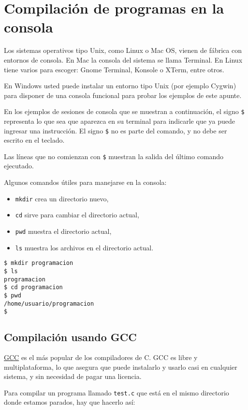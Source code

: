 \section{Compilación de programas en la consola}

Los sistemas operativos tipo Unix, como Linux o Mac OS, vienen de
fábrica con entornos de consola. En Mac la consola del sistema se llama
Terminal. En Linux tiene varios para escoger: Gnome Terminal, Konsole o
XTerm, entre otros.

En Windows usted puede instalar un entorno tipo Unix (por ejemplo
Cygwin) para disponer de una consola funcional para probar los ejemplos
de este apunte.

En los ejemplos de sesiones de consola que se muestran a continuación,
el signo \lstinline!$! representa lo que sea que aparezca en su terminal
para indicarle que ya puede ingresar una instrucción. El signo
\lstinline!$! no es parte del comando, y no debe ser escrito en el
teclado.

Las líneas que no comienzan con \lstinline!$! muestran la salida del
último comando ejecutado.

Algunos comandos útiles para manejarse en la consola:

\begin{itemize}
\item
  \lstinline!mkdir! crea un directorio nuevo,
\item
  \lstinline!cd! sirve para cambiar el directorio actual,
\item
  \lstinline!pwd! muestra el directorio actual,
\item
  \lstinline!ls! muestra los archivos en el directorio actual.
\end{itemize}

\begin{lstlisting}
$ mkdir programacion
$ ls
programacion
$ cd programacion
$ pwd
/home/usuario/programacion
$
\end{lstlisting}

\subsection{Compilación usando GCC}

\href{http://gcc.gnu.org/}{GCC} es el más popular de los compiladores de
C. GCC es libre y multiplataforma, lo que asegura que puede instalarlo y
usarlo casi en cualquier sistema, y sin necesidad de pagar una licencia.

Para compilar un programa llamado \lstinline!test.c! que está en el
mismo directorio donde estamos parados, hay que hacerlo así:

